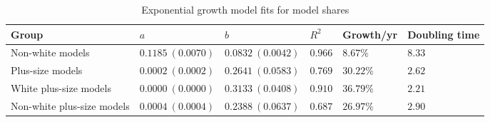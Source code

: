\begin{table}[htbp]
\centering
\caption{Exponential growth model fits for model shares}
\label{tab:expfits}
\begin{tabular}{llllll}
\toprule
Group & $a$ & $b$ & $R^2$ & Growth/yr & Doubling time \\
\midrule
Non-white models & $0.1185\ (0.0070)$ & $0.0832\ (0.0042)$ & $0.966$ & $8.67\%$ & $8.33$ \\
Plus-size models & $0.0002\ (0.0002)$ & $0.2641\ (0.0583)$ & $0.769$ & $30.22\%$ & $2.62$ \\
White plus-size models & $0.0000\ (0.0000)$ & $0.3133\ (0.0408)$ & $0.910$ & $36.79\%$ & $2.21$ \\
Non-white plus-size models & $0.0004\ (0.0004)$ & $0.2388\ (0.0637)$ & $0.687$ & $26.97\%$ & $2.90$ \\
\bottomrule
\end{tabular}
\end{table}
